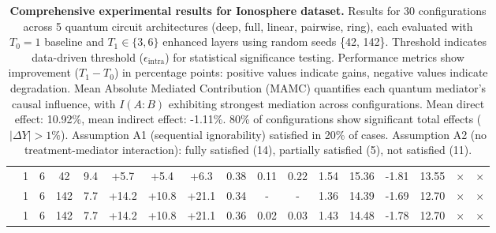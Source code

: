 \documentclass[
    reprint,
    amsmath, amssymb,
    aps,
    floatfix,
    nofootinbib
]{revtex4-1}
\begin{document}
\begin{table}[h!]
{\begin{tabular}{l|cc|c|c|ccc|cccc|ccc|cc}
 & 1 & 6 & 42 & 9.4 & +5.7 & +5.4 & +6.3 & 0.38 & 0.11 & 0.22 & 1.54 & 15.36 & -1.81 & 13.55 & $\times$ & $\times$ \\
 & 1 & 6 & 142 & 7.7 & +14.2 & +10.8 & +21.1 & 0.34 & - & - & 1.36 & 14.39 & -1.69 & 12.70 & $\times$ & $\times$ \\
 & 1 & 6 & 142 & 7.7 & +14.2 & +10.8 & +21.1 & 0.36 & 0.02 & 0.03 & 1.43 & 14.48 & -1.78 & 12.70 & $\times$ & $\times$ \\
\bottomrule
\hline
\end{tabular}
}
\caption{\textbf{Comprehensive experimental results for Ionosphere dataset.} Results for 30 configurations across 5 quantum circuit architectures (deep, full, linear, pairwise, ring), each evaluated with $T_0=1$ baseline and $T_1 \in \{3,6\}$ enhanced layers using random seeds \{42, 142\}. Threshold indicates data-driven threshold ($\epsilon_{\text{intra}}$) for statistical significance testing. Performance metrics show improvement ($T_1 - T_0$) in percentage points: positive values indicate gains, negative values indicate degradation. Mean Absolute Mediated Contribution (MAMC) quantifies each quantum mediator's causal influence, with $I(A:B)$ exhibiting strongest mediation across configurations. Mean direct effect: 10.92\%, mean indirect effect: -1.11\%. 80\% of configurations show significant total effects ($|\Delta Y|>1\%$). Assumption A1 (sequential ignorability) satisfied in 20\% of cases. Assumption A2 (no treatment-mediator interaction): fully satisfied (14), partially satisfied (5), not satisfied (11).}
\label{tab:ionosphere_comprehensive}
\end{table}
\clearpage
\end{document}
